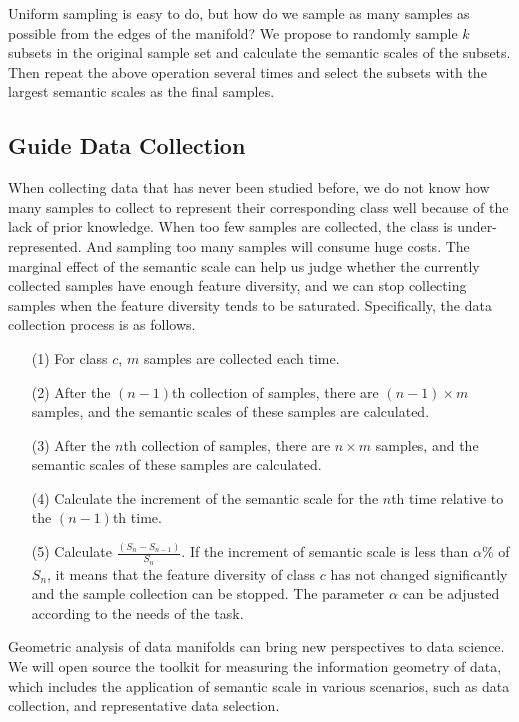 \documentclass[10pt]{article} %
\begin{document}
Uniform sampling is easy to do, but how do we sample as many samples as possible from the edges of the manifold? We propose to randomly sample $k$ subsets in the original sample set and calculate the semantic scales of the subsets. Then repeat the above operation several times and select the subsets with the largest semantic scales as the final samples.


\subsection{Guide Data Collection\label{I.2}}

When collecting data that has never been studied before, we do not know how many samples to collect to represent their corresponding class well because of the lack of prior knowledge. When too few samples are collected, the class is under-represented. And sampling too many samples will consume huge costs. The marginal effect of the semantic scale can help us judge whether the currently collected samples have enough feature diversity, and we can stop collecting samples when the feature diversity tends to be saturated. Specifically, the data collection process is as follows.

\begin{itemize}
     \item[(1)] For class $c$, $m$ samples are collected each time.
     \item[(2)] After the $(n-1)$th collection of samples, there are $(n-1)\times m$ samples, and the semantic scales of these samples are calculated.
     \item[(3)] After the $n$th collection of samples, there are $n \times m$ samples, and the semantic scales of these samples are calculated.
     \item[(4)] Calculate the increment of the semantic scale for the $n$th time relative to the $(n-1)$th time.
     \item[(5)] Calculate $\frac{(S_n-S_{n-1})}{S_n}$. If the increment of semantic scale is less than $\alpha\%$ of $S_n$, it means that the feature diversity of class $c$ has not changed significantly and the sample collection can be stopped. The parameter $\alpha$ can be adjusted according to the needs of the task.
\end{itemize}

Geometric analysis of data manifolds can bring new perspectives to data science. We will open source the toolkit for measuring the information geometry of data, which includes the application of semantic scale in various scenarios, such as data collection, and representative data selection.
\end{document}
